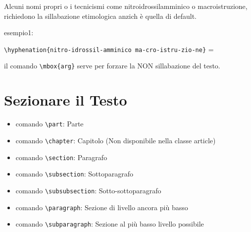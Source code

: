 \documentclass{article}
\begin{document}
            Alcuni nomi propri o i tecnicismi come nitroidrossilamminico o macroistruzione, richiedono la sillabazione etimologica anzich è quella di default.
            
            esempio1:
                \begin{center}
                    \verb!\hyphenation{nitro-idrossil-amminico ma-cro-istru-zio-ne}! = 
                \end{center}
            
            il comando \verb!\mbox{arg}! serve per forzare la NON sillabazione del testo.
        
        \section{Sezionare il Testo}
            \begin{itemize}
                \item comando \verb!\part!: Parte
                \item comando \verb!\chapter!: Capitolo (Non disponibile nella classe article)
                \item comando \verb!\section!: Paragrafo
                \item comando \verb!\subsection!: Sottoparagrafo
                \item comando \verb!\subsubsection!: Sotto-sottoparagrafo
                \item comando \verb!\paragraph!: Sezione di livello ancora più basso
                \item comando \verb!\subparagraph!: Sezione al più basso livello possibile
            \end{itemize}
\end{document}

